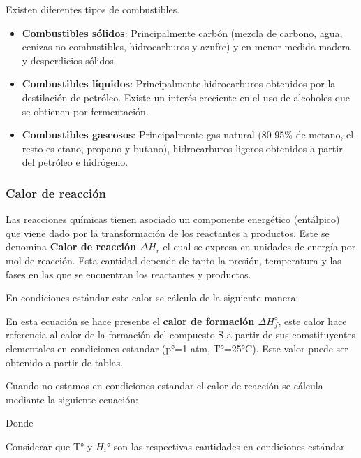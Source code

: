 Existen diferentes tipos de combustibles.
\begin{itemize}
    \item \textbf{Combustibles sólidos}: Principalmente carbón (mezcla de carbono, agua, cenizas no combustibles, hidrocarburos y azufre) y en menor medida madera y desperdicios sólidos.
    \item \textbf{Combustibles líquidos}: Principalmente hidrocarburos obtenidos por la destilación de petróleo. Existe un interés creciente en el uso de alcoholes que se obtienen por fermentación.
    \item \textbf{Combustibles gaseosos}: Principalmente gas natural (80-95\% de metano, el resto es etano, propano y butano), hidrocarburos ligeros obtenidos a partir del petróleo e hidrógeno.
\end{itemize}

\subsubsection{Calor de reacción}
 
Las reacciones químicas tienen asociado un componente energético (entálpico) que viene dado por la transformación de los reactantes a productos. Este se denomina \textbf{Calor de reacción $\Delta H_r$} el cual se expresa en unidades de energía por mol de reacción.
Esta cantidad depende de tanto la presión, temperatura y las fases en las que se encuentran los reactantes y productos.

En condiciones estándar este calor se cálcula de la siguiente manera:


En esta ecuación se hace presente el \textbf{calor de formación $\Delta H_f^{\circ}$}, este calor hace referencia al calor de la formación del compuesto S a partir de sus comstituyentes elementales en condiciones estandar (p°=1 atm, T°=25°C).
Este valor puede ser obtenido a partir de tablas.

Cuando no estamos en condiciones estandar el calor de reacción se cálcula mediante la siguiente ecuación:

Donde 


Considerar que T° y $H_i°$ son las respectivas cantidades en condiciones estándar.

